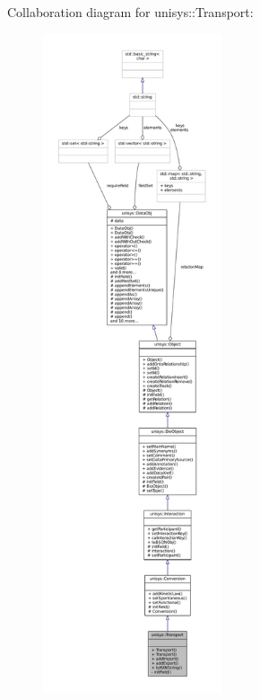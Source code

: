 Collaboration diagram for unisys\-:\-:Transport\-:
\nopagebreak
\begin{figure}[H]
\begin{center}
\leavevmode
\includegraphics[height=550pt]{classunisys_1_1Transport__coll__graph}
\end{center}
\end{figure}
